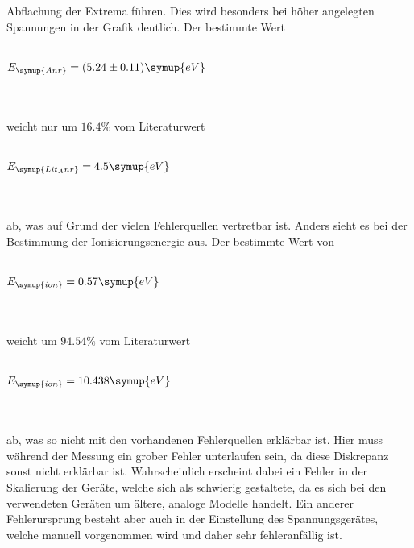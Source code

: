 Abflachung der Extrema führen. Dies wird besonders bei höher angelegten Spannungen in der Grafik deutlich. Der bestimmte Wert
\\ \\
    \centerline{$E_{\symup{Anr}} = (5.24 \pm 0.11) \symup{eV}$} 
\\ \\
weicht nur um $16.4\%$ vom Literaturwert     
\\ \\
\centerline{$E_{\symup{Lit_Anr}} = 4.5 \symup{eV}$\cite{anr}} 
\\ \\
ab, was auf Grund der vielen Fehlerquellen vertretbar ist.
Anders sieht es bei der Bestimmung der Ionisierungsenergie aus. Der bestimmte Wert von
\\ \\
    \centerline{$E_{\symup{ion}} = 0.57 \symup{eV}$}
\\ \\
weicht um $94.54\%$ vom Literaturwert
\\ \\
    \centerline{$E_{\symup{ion}} = 10.438 \symup{eV}$  \cite{ion}}
\\ \\
ab, was so nicht mit den vorhandenen Fehlerquellen erklärbar ist. Hier muss während der Messung ein grober Fehler unterlaufen sein, da diese 
Diskrepanz sonst nicht erklärbar ist. Wahrscheinlich erscheint dabei ein Fehler in der Skalierung der Geräte, welche sich als schwierig gestaltete,
da es sich bei den verwendeten Geräten um ältere, analoge Modelle handelt. Ein anderer Fehlerursprung besteht aber auch in der Einstellung des 
Spannungsgerätes, welche manuell vorgenommen wird und daher sehr fehleranfällig ist.

